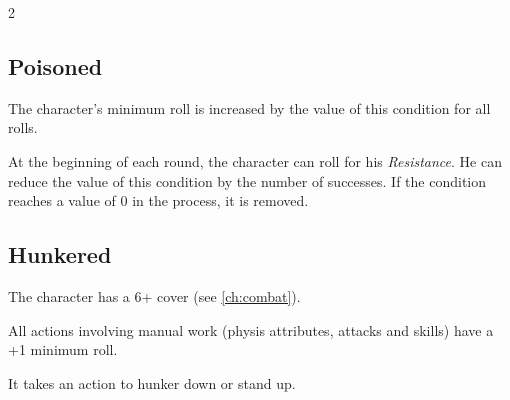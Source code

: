 \begin{multicols}{2}
\subsection{Poisoned}

The character's minimum roll is increased by the value of this condition for all rolls.

At the beginning of each round, the character can roll for his \textit{Resistance}. He can reduce the value of this condition by the number of successes. If the condition reaches a value of 0 in the process, it is removed.

\subsection{Hunkered}

The character has a 6+ cover (see \cref{ch:combat}).

All actions involving manual work (physis attributes, attacks and skills) have a +1 minimum roll.

It takes an action to hunker down or stand up.
\end{multicols}
